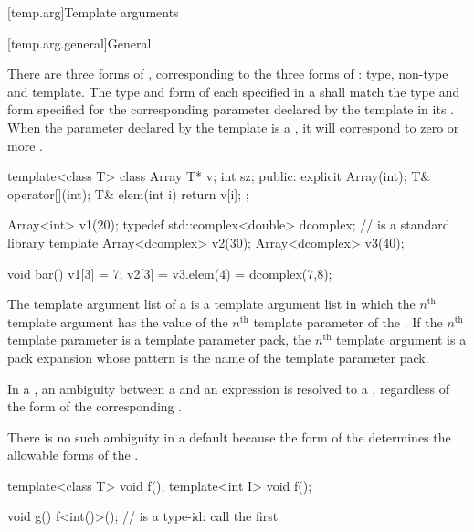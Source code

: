 [temp.arg]{Template arguments}

[temp.arg.general]{General}

\pnum
{}%
There are three forms of
,
corresponding to the three forms of
:
type, non-type and template.
The type and form of each
specified in a
shall match the type and form specified for the corresponding
parameter declared by the template in its
.
When the parameter declared by the template is a
, it will correspond to zero or more
.
\begin{example}
\begin{codeblock}
template<class T> class Array {
  T* v;
  int sz;
public:
  explicit Array(int);
  T& operator[](int);
  T& elem(int i) { return v[i]; }
};

Array<int> v1(20);
typedef std::complex<double> dcomplex;  //  is a standard library template
Array<dcomplex> v2(30);
Array<dcomplex> v3(40);

void bar() {
  v1[3] = 7;
  v2[3] = v3.elem(4) = dcomplex(7,8);
}
\end{codeblock}
\end{example}

\pnum
The template argument list of a  is
a template argument list in which the $n^\text{th}$ template argument
has the value of
the $n^\text{th}$ template parameter of the .
If the $n^\text{th}$ template parameter is
a template parameter pack,
the $n^\text{th}$ template argument is a pack expansion
whose pattern is the name of the template parameter pack.

\pnum
In a
,
an ambiguity between a
and an expression is resolved to a
,
regardless of the form of the corresponding
.
\begin{footnote}
There is no such ambiguity in a default
because the form of the
determines the allowable forms of the
.
\end{footnote}
\begin{example}
\begin{codeblock}
template<class T> void f();
template<int I> void f();

void g() {
  f<int()>();       //  is a type-id: call the first 
}
\end{codeblock}
\end{example}

